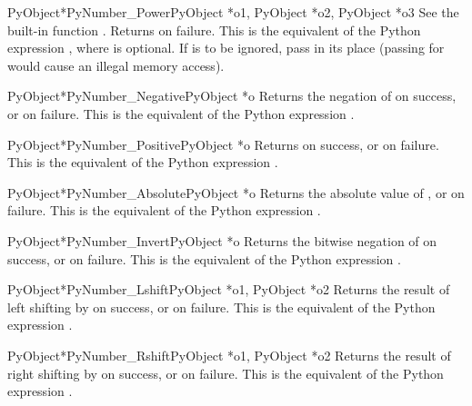 \documentclass{manual}
\begin{document}
\begin{cfuncdesc}{PyObject*}{PyNumber_Power}{PyObject *o1, PyObject *o2, PyObject *o3}
See the built-in function .  Returns
\NULL{} on failure. This is the equivalent of the Python expression
, where  is optional.
If  is to be ignored, pass  in its place
(passing \NULL{} for  would cause an illegal memory access).
\end{cfuncdesc}


\begin{cfuncdesc}{PyObject*}{PyNumber_Negative}{PyObject *o}
Returns the negation of  on success, or \NULL{} on failure.
This is the equivalent of the Python expression .
\end{cfuncdesc}


\begin{cfuncdesc}{PyObject*}{PyNumber_Positive}{PyObject *o}
Returns  on success, or \NULL{} on failure.
This is the equivalent of the Python expression .
\end{cfuncdesc}


\begin{cfuncdesc}{PyObject*}{PyNumber_Absolute}{PyObject *o}
Returns the absolute value of , or \NULL{} on failure.  This is
the equivalent of the Python expression .
\end{cfuncdesc}


\begin{cfuncdesc}{PyObject*}{PyNumber_Invert}{PyObject *o}
Returns the bitwise negation of  on success, or \NULL{} on
failure.  This is the equivalent of the Python expression
.
\end{cfuncdesc}


\begin{cfuncdesc}{PyObject*}{PyNumber_Lshift}{PyObject *o1, PyObject *o2}
Returns the result of left shifting  by  on success,
or \NULL{} on failure.  This is the equivalent of the Python
expression .
\end{cfuncdesc}


\begin{cfuncdesc}{PyObject*}{PyNumber_Rshift}{PyObject *o1, PyObject *o2}
Returns the result of right shifting  by  on success,
or \NULL{} on failure.  This is the equivalent of the Python
expression .
\end{cfuncdesc}
\end{document}
